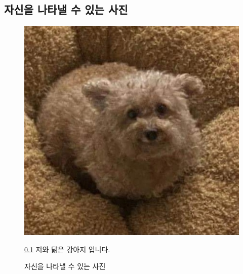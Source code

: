 \documentclass{article}
\begin{document}
\subsection{자신을 나타낼 수 있는 사진}
\label{sec1:subsec1}
\begin{figure}[h!]
\begin{center}
    \includegraphics[scale=0.4]{happydoggy.jpg}
    \caption{자신을 나타낼 수 있는 사진}
    \label{fig:fig1}
    \ref{sec1:subsec1} 저와 닮은 강아지 입니다.
\end{center}

\label{sec:sec2}

\end{figure}
\end{document}

